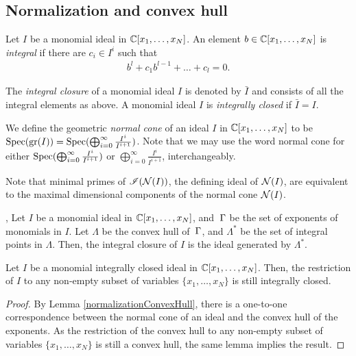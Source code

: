 \documentclass[11pt,a4paper,leqno,noamsfonts]{amsart}
\numberwithin{equation}{section}
\begin{document}
\subsection{Normalization and convex hull}

\begin{definition}
Let $I$ be a monomial ideal in ${\mathbb{C}}[x_1,\ldots,x_N]$. An element $b\in {\mathbb{C}}[x_1,\ldots,x_N]$ is \textit{integral} if there are $c_i\in I^{i}$ such that 
\begin{align*}
    b^{l}+c_1b^{l-1}+\ldots+c_l=0.
\end{align*}


    The \textit{integral closure} of a monomial ideal $I$ is denoted by $\bar{I}$ and consists of all the integral elements as above. A monomial ideal $I$ is  \textit{integrally closed} if $\bar{I}=I$.
\end{definition}

\begin{definition}
    We define the geometric \textit{normal cone} of an ideal $I$ in ${\mathbb{C}}[x_1,\ldots,x_N]$ to be $\operatorname{Spec}(\mathrm{gr}(I))=\operatorname{Spec}(\bigoplus_{i=0}^{\infty}\frac{I^i}{I^{i+1}})$. Note that we may use the word normal cone for either $\operatorname{Spec}(\bigoplus_{i=0}^{\infty}\frac{I^i}{I^{i+1}})$ or $\bigoplus_{i=0}^{\infty}\frac{I^i}{I^{i+1}}$, interchangeably.
\end{definition}
Note that minimal primes of  $\mathscr{I}({{\mathcal N}(I)})$, the defining ideal of ${\mathcal N}(I)$, are equivalent to the maximal dimensional components of the normal cone ${\mathcal N}(I)$.

\begin{lemma}\cite[Exercise 4.23]{Eisenbudcomm}, \cite[Proposition 1.4.6]{Huneke-Swanson} \label{normalizationConvexHull} Let $I$ be a monomial ideal in ${\mathbb{C}}[x_1,\ldots,x_N]$, and $\text{\:}\Gamma$ be the set of exponents of monomials in $I$. Let $\Lambda$ be the convex hull of $\text{\:}\Gamma$, and $\Lambda^*$ be the set of integral points in  $\Lambda$. Then, the integral closure of $I$ is the ideal generated by $\Lambda^*$.
\end{lemma}


\begin{corollary} \label{cor: restriction}
    Let $I$  be a monomial integrally closed ideal in ${\mathbb{C}}[x_1,\ldots,x_N]$. Then, the restriction of $I$ to any non-empty subset of variables $\{x_1,\ldots,x_N\}$ is still integrally closed.
\end{corollary}

    
\begin{proof}
 By Lemma \ref{normalizationConvexHull}, there is a one-to-one correspondence between the normal cone of an ideal and the convex hull of the exponents. As the restriction of the convex hull to any non-empty subset of variables $\{x_1,\ldots,x_N\}$ is still a convex hull, the same lemma implies the result.
\end{proof}
\end{document}
